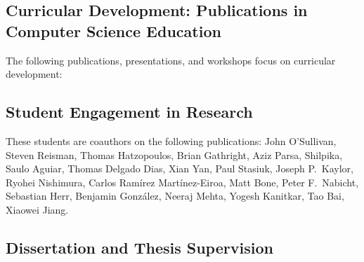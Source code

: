 \subsection{Curricular Development: Publications in Computer Science Education}

The following publications, presentations, and workshops focus on curricular development:

\begin{refsection}
\nocite{Scala_2019}
\nocite{CDERBook}
\nocite{ScalaDays_2017}
\nocite{wl_honig_framework_2015}
\nocite{mark_lewis_scala_2014}
\nocite{mark_lewis_using_2013}
\nocite{EduPar2012}
\nocite{EduPar2011}
\nocite{2003_AOSD}
\nocite{chung2003}
\nocite{Triveni_OOPSLAEDU_1998}
\nocite{Laufer_MCC_1997}
\printbibliography[heading=none,sorting=ynt]
\end{refsection}
   

\subsection{Student Engagement in Research}

These students are coauthors on the following publications:
John O’Sullivan,
Steven Reisman, 
Thomas Hatzopoulos, 
Brian Gathright, 
Aziz Parsa,
Shilpika, 
Saulo Aguiar,
Thomas Delgado Dias, 
Xian Yan,
Paul Stasiuk,
Joseph P.\ Kaylor,
Ryohei Nishimura, 
Carlos Ramírez Martínez-Eiroa,
Matt Bone, 
Peter F.\ Nabicht,
Sebastian Herr,
Benjamin González,
Neeraj Mehta, 
Yogesh Kanitkar,
Tao Bai,
Xiaowei Jiang.

\begin{refsection}
\nocite{Scala_2019}
\nocite{doi:10.4137/EBO.S32757}
\nocite{WSSSPE_2015}
\nocite{GCASR_2015}
\nocite{GCASR_2015}
\nocite{gcasr_2013_environmental_data}
\nocite{gcasr_2013_tablets}
\nocite{kaylor_simplifying_2012}
\nocite{CloudBookRestFS}
\nocite{kaylor_restfs_2011}
\nocite{DBLP:conf/icsoft/2011-2}
\nocite{george_k_thiruvathukal_virtualization_2010}
\nocite{kaylor_online_2010}
\nocite{k_laufer_putting_2009}
\nocite{DBLP:conf/seke/HerrLSTW08}
\nocite{matt_bone_taming_2008}
\nocite{IPDPS_2007}
\nocite{konstantin_laufer_hike_2007}
\nocite{chung2003}
\nocite{DBLP:conf/cp/GuptaJJJL00}
\printbibliography[heading=none,sorting=ynt]
\end{refsection}


\subsection{Dissertation and Thesis Supervision}

